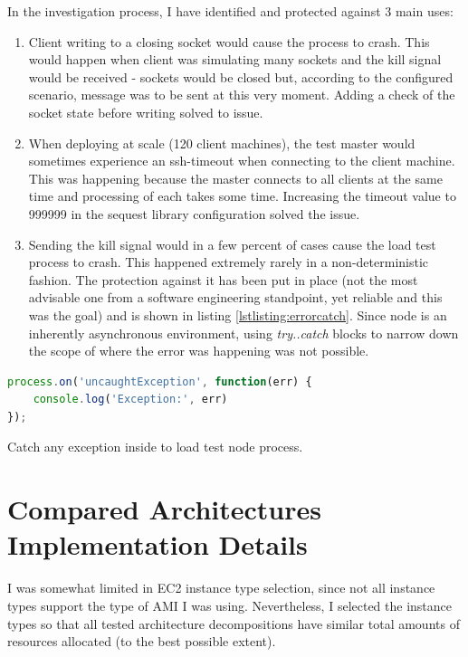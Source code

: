 \documentclass{uvamscse}
\begin{document}
In the investigation process, I have identified and protected against 3 main uses:

\begin{enumerate}
  \item Client writing to a closing socket would cause the process to crash. This would happen when client was simulating many sockets and the kill signal would be received - sockets would be closed but, according to the configured scenario, message was to be sent at this very moment. Adding a check of the socket state before writing solved to issue.
  \item When deploying at scale (120 client machines), the test master would sometimes experience an ssh-timeout when connecting to the client machine. This was happening because the master connects to all clients at the same time and processing of each takes some time. Increasing the timeout value to 999999 in the sequest library configuration solved the issue.
  \item Sending the kill signal would in a few percent of cases cause the load test process to crash. This happened extremely rarely in a non-deterministic fashion. The protection against it has been put in place (not the most advisable one from a software engineering standpoint, yet reliable and this was the goal) and is shown in listing \ref{lstlisting:errorcatch}. Since node is an inherently asynchronous environment, using \textit{try..catch} blocks to narrow down the scope of where the error was happening was not possible.
\end{enumerate}

\begin{sourcecode}[H]
\begin{lstlisting}[language=javascript]
process.on('uncaughtException', function(err) {
    console.log('Exception:', err)
});
\end{lstlisting}
\caption{Catch any exception inside to load test node process.}
\label{lstlisting:errorcatch}
\end{sourcecode}

\section{Compared Architectures Implementation Details}\label{Compared Architectures Implementation Details}

I was somewhat limited in EC2 instance type selection, since not all instance types support the type of AMI I was using. Nevertheless, I selected the instance types so that all tested architecture decompositions have similar total amounts of resources allocated (to the best possible extent).
\end{document}
